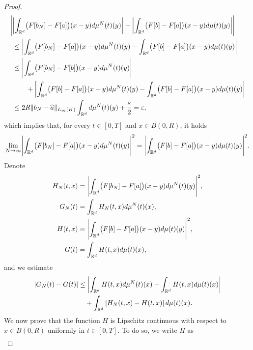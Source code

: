 \begin{proof}
	\begin{align*}
		\Biggl|
			&\biggl|\int_{\mathbb{R}^d}\bigl(F[ b_{N}]-F[a]\bigr)(x-y)d\mu^{N}(t)(y)\biggr|
				-\biggl|\int_{\mathbb{R}^d}\bigl(F[ b]-F[a]\bigr)(x-y)d\mu(t)(y)\biggr|\Biggr|\\
			&\leq\biggl|\int_{\mathbb{R}^d}\bigl(F[ b_{N}]-F[a]\bigr)(x-y)d\mu^{N}(t)(y)
					-\int_{\mathbb{R}^d}\bigl(F[ b]-F[a]\bigr)(x-y)d\mu(t)(y)\biggr|\\
			&\leq\Biggl|\int_{\mathbb{R}^d}
				\bigl(F[ b_{N}]-F[ b]\bigr)(x-y)d\mu^{N}(t)(y)\Biggr|\\
			&\qquad +\biggl|\int_{\mathbb{R}^d}\bigl(F[ b]-F[a]\bigr)(x-y)d\mu^{N}(t)(y)
					-\int_{\mathbb{R}^d}\bigl(F[ b]-F[a]\bigr)(x-y)d\mu(t)(y)\biggr|\\
			&\leq2R \| b_{N}-\widehat  a\|_{L_\infty(K)}\int_{\mathbb{R}^d}d\mu^{N}(t)(y)+\frac{\varepsilon}{2}=\varepsilon,
	\end{align*}
	which implies that, for every $t \in [0,T]$ and $x \in B(0,R)$, it holds
	\begin{align}\label{firstlim}
		\lim_{N\rightarrow\infty}\Biggl|\int_{\mathbb{R}^d}\bigl(F[ b_{N}]-F[a]\bigr)(x-y)d\mu^{N}(t)(y)\Biggr|^2
			=\Biggl|\int_{\mathbb{R}^d}\bigl(F[ b]-F[a]\bigr)(x-y)d\mu(t)(y)\Biggr|^2.
	\end{align}
	Denote
	\begin{align*}
		H_N(t,x)&=\Biggl|\int_{\mathbb{R}^d}\bigl(F[ b_{N}]-F[a]\bigr)(x-y)d\mu^{N}(t)(y)\Biggr|^2,\\
		G_N(t)&= \int_{\mathbb{R}^d}H_N(t,x)d\mu^N(t)(x),\\
		H(t,x)&= \Biggl|\int_{\mathbb{R}^d}\bigl(F[ b]-F[a]\bigr)(x-y)d\mu(t)(y)\Biggr|^2,\\
		G(t)&= \int_{\mathbb{R}^d}H(t,x)d\mu(t)(x),
	\end{align*}
	and we estimate
	\begin{align}
		|G_N(t)-G(t)|&\leq \left|\int_{\mathbb{R}^d}H(t,x)d\mu^N(t)(x) - \int_{\mathbb{R}^d}H(t,x)d\mu(t)(x)\right| \nonumber\\
		&\quad + \int_{\mathbb{R}^d}\left|H_N(t,x) - H(t,x)\right|d\mu(t)(x). \label{pippo3}
	\end{align}
	We now prove that the function $H$ is Lipschitz continuous with respect to $x \in B(0,R)$ uniformly in $t \in [0,T]$. To do so, we write $H$ as
	\begin{align*}

\end{align*}
\end{proof}
